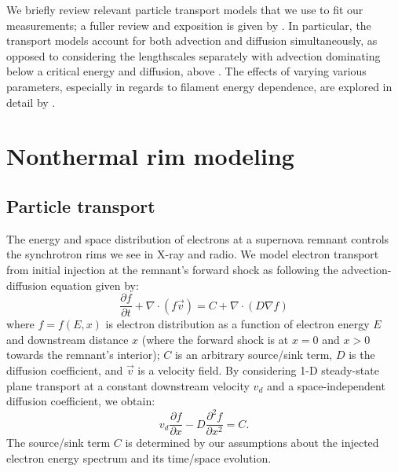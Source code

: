 \documentclass[iop, apj, numberedappendix, twocolappendix]{emulateapj}
\newcommand*{\ptl}{\partial}
\newcommand*{\del}{\nabla}
\begin{document}
We briefly review relevant particle transport models that we use to fit our
measurements; a fuller review and exposition is given by .
In particular, the transport models
account for both advection and diffusion simultaneously, as opposed to
considering the lengthscales separately with advection dominating below a
critical energy and diffusion, above
\citep{bamba2003, vink2003, yamazaki2004, bamba2005-hist}
.
The effects of varying various parameters, especially in regards to filament
energy dependence, are explored in detail by .

\section{Nonthermal rim modeling}\label{sec:models}

\subsection{Particle transport}\label{sec:transport}

The energy and space distribution of electrons at a supernova remnant
controls the synchrotron rims we see in X-ray and radio.  We model electron
transport from initial injection at the remnant's forward shock as following
the advection-diffusion equation given by:
\begin{equation}
  \frac{\ptl f}{\ptl t} + \del \cdot \left( f \vec{v} \right)
  = C + \del \cdot \left( D \del f \right)
\end{equation}
where $f = f(E,x)$ is electron distribution as a function of electron energy
$E$ and downstream distance $x$ (where the forward shock is at $x=0$ and
$x>0$ towards the remnant's interior); $C$ is an arbitrary source/sink term,
$D$ is the diffusion coefficient, and $\vec{v}$ is a velocity field.
By considering 1-D steady-state plane transport at a constant downstream
velocity $v_d$  and a space-independent diffusion
coefficient, we obtain:
\begin{equation}
    v_d \frac{\ptl f}{\ptl x} - D \frac{\ptl^2 f}{\ptl x^2} = C .
\end{equation}
The source/sink term $C$ is determined by our assumptions about the injected
electron energy spectrum and its time/space evolution.
\end{document}
